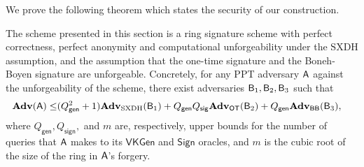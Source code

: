 We prove the following theorem which states the security of our construction.

\begin{theorem}\label{theo:security-sxdh}
The scheme presented in this section is a ring signature scheme
with perfect correctness, perfect anonymity and computational unforgeability under the
$\mathrm{SXDH}$ assumption, and the assumption
that the one-time signature and the Boneh-Boyen signature are unforgeable.
Concretely, for any PPT adversary $\mathsf{A}$ against the unforgeability of the scheme, there exist adversaries $\mathsf{B}_1,\mathsf{B}_2,\mathsf{B}_3$ such that
\begin{align*}
\mathbf{Adv}(\mathsf{A})\leq &(Q_\mathsf{gen}^2+1)\mathbf{Adv}_{\mathrm{SXDH}}(\mathsf{B}_1)+Q_\mathsf{gen}Q_\mathsf{sig}\mathbf{Adv}_{\mathsf{OT}}(\mathsf{B}_2)+Q_\mathsf{gen}\mathbf{Adv}_{\mathsf{BB}}(\mathsf{B}_3),
\end{align*}
where $Q_\mathsf{gen},Q_\mathsf{sign},$ and $m$ are, respectively, upper bounds for the number of queries that $\mathsf{A}$ makes to its $\mathsf{VKGen}$ and $\mathsf{Sign}$ oracles, and $m$ is the cubic root of the size of the ring in $\mathsf{A}$'s forgery.
\end{theorem}
